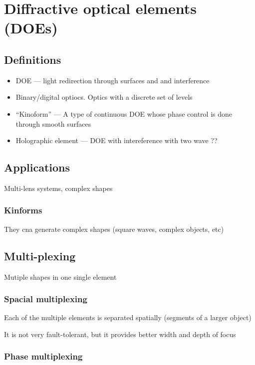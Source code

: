 \documentclass[../main/main.tex]{subfiles}
\begin{document}
\chapter{Diffractive optical elements (DOEs)}

\section{Definitions}

\begin{itemize}
	\item DOE --- light redirection through surfaces and and interference
	\item Binary/digital optiocs. Optics with a discrete set of levels
	\item ``Kinoform'' --- A type of continuous DOE whose phase control is done through smooth surfaces
	\item Holographic element --- DOE with intereference with two wave ??
\end{itemize}

\section{Applications}

Multi-lens systems, complex shapes

\subsection{Kinforms}

They cna generate complex shapes (square waves, complex objects, etc)

\section{Multi-plexing}

Mutiple shapes in one single element

\subsection{Spacial multiplexing}

Each of the multiple elements is separated spatially (segments of a larger object)

It is not very fault-tolerant, but it provides better width and depth of focus

\subsection{Phase multiplexing}
\end{document}
